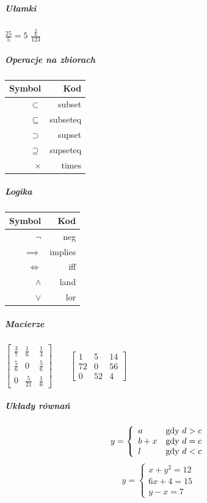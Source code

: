 \documentclass[a4paper, 11pt]{article}
\begin{document}
\subparagraph{Ułamki}
$ \frac{25}{5} = 5 $ \newline
$ \frac{\frac{3}{6}}{123} $
\subparagraph{Operacje na zbiorach}
\begin{tabular}{| r | r |}
\hline
Symbol & Kod \\
\hline
$ \subset $ & subset \\
\hline
$ \subseteq $ & subseteq \\
\hline
$ \supset $ & supset \\
\hline
$ \supseteq $ & supseteq \\
\hline 
$ \times $ & times \\
\hline
\end{tabular}
\subparagraph{Logika}
\begin{tabular}{|r|r|}
\hline
Symbol & Kod \\
\hline
$ \neg $ & neg \\ %
\hline
$ \implies $ & implies \\ %
\hline
$ \iff $ & iff \\ %
\hline
$ \land $ & land \\	%
\hline 
$ \lor $ & lor \\ %
\hline
\end{tabular}
\subparagraph{Macierze}
\begin{math}
\begin{bmatrix}
       \frac{3}{7} & \frac{1}{6} & \frac{1}{4} \\[0.3em]
       \frac{5}{6} & 0           & \frac{5}{6} \\[0.3em]     
       0           & \frac{5}{21} & \frac{1}{6}
     \end{bmatrix} 
           \qquad %
           \begin{bmatrix}
       1 & 5 & 14 \\[0.3em]
      72 & 0  & 56 \\[0.3em]     
       0 & 52 & 4
     \end{bmatrix} 
\end{math}
\newline
\subparagraph{Układy równań}
$$
y = \left\{ \begin{array}{ll}
a & \textrm{gdy $d>c$}\\
b+x & \textrm{gdy $d=c$}\\
l & \textrm{gdy $ d < c $}
\end{array} \right.
$$
$$
y = \left\{ \begin{array}{ll}
x+y^2 = 12 \\
6x+4 = 15 \\
y-x = 7
\end{array} \right.
$$
\newline
\newpage
\end{document}
